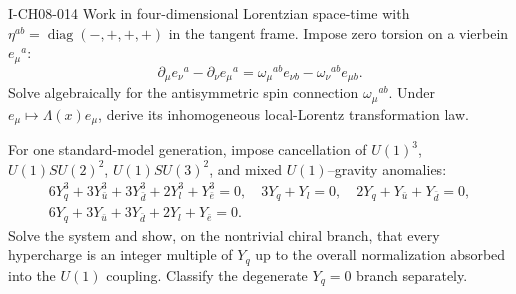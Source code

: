 \begin{exercise}{I-CH08-014}
Work in four-dimensional Lorentzian space-time with
$\eta^{ab}=\operatorname{diag}(-,+,+,+)$ in the tangent frame.
Impose zero torsion on a vierbein $e_\mu{}^a$:
\[
 \partial_\mu e_\nu{}^a-\partial_\nu e_\mu{}^a
 =\omega_\mu{}^{ab}e_{\nu b}-\omega_\nu{}^{ab}e_{\mu b}.
\]
Solve algebraically for the antisymmetric spin connection
$\omega_\mu{}^{ab}$.  Under $e_\mu\mapsto\Lambda(x)e_\mu$, derive its
inhomogeneous local-Lorentz transformation law.

For one standard-model generation, impose cancellation of
$U(1)^3$, $U(1)SU(2)^2$, $U(1)SU(3)^2$, and mixed
$U(1)$--gravity anomalies:
\[
\begin{gathered}
6Y_q^3+3Y_{\bar u}^3+3Y_{\bar d}^3+2Y_l^3+Y_{\bar e}^3=0,\quad
3Y_q+Y_l=0,\quad 2Y_q+Y_{\bar u}+Y_{\bar d}=0,\\
6Y_q+3Y_{\bar u}+3Y_{\bar d}+2Y_l+Y_{\bar e}=0.
\end{gathered}
\]
Solve the system and show, on the nontrivial chiral branch, that every
hypercharge is an integer multiple of $Y_q$ up to the overall normalization
absorbed into the $U(1)$ coupling.  Classify the degenerate $Y_q=0$ branch
separately.
\end{exercise}
